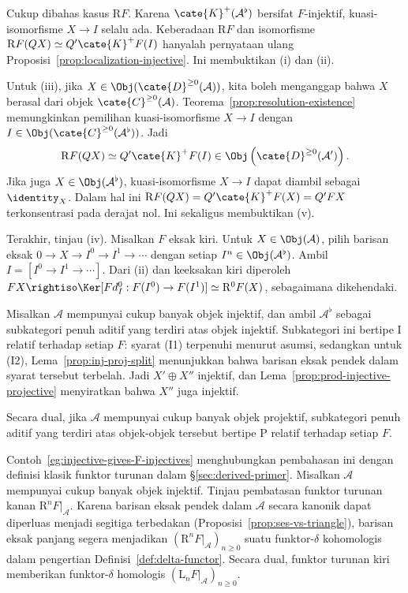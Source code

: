 \begin{bukti}
	Cukup dibahas kasus $\mathrm{R}F$. Karena
	$\cate{K}^+(\mathcal{A}^\flat)$ bersifat $F$-injektif, kuasi-isomorfisme
	$X\to I$ selalu ada. Keberadaan $\mathrm{R}F$ dan isomorfisme
	$\mathrm{R}F(QX)\simeq Q'\cate{K}^+F(I)$ hanyalah pernyataan ulang
	Proposisi~\ref{prop:localization-injective}. Ini membuktikan (i) dan (ii).

	Untuk (iii), jika $X\in\Obj(\cate{D}^{\geq0}(\mathcal{A}))$, kita boleh
	menganggap bahwa $X$ berasal dari objek $\cate{C}^{\geq0}(\mathcal{A})$.
	Teorema~\ref{prop:resolution-existence} memungkinkan pemilihan
	kuasi-isomorfisme $X\to I$ dengan
	$I\in\Obj(\cate{C}^{\geq0}(\mathcal{A}^\flat))$. Jadi
	\[ \mathrm{R}F(QX) \simeq Q' \cate{K}^+ F(I) \in \Obj\left( \cate{D}^{\geq 0}(\mathcal{A}')\right). \]
	Jika juga $X\in\Obj(\mathcal{A}^\flat)$, kuasi-isomorfisme $X\to I$ dapat
	diambil sebagai $\identity_X$. Dalam hal ini
	$\mathrm{R}F(QX)=Q'\cate{K}^+F(X)=Q'FX$ terkonsentrasi pada derajat nol.
	Ini sekaligus membuktikan (v).

	Terakhir, tinjau (iv). Misalkan $F$ eksak kiri. Untuk
	$X\in\Obj(\mathcal{A})$, pilih barisan eksak
	$0\to X\to I^0\to I^1\to\cdots$ dengan setiap
	$I^n\in\Obj(\mathcal{A}^\flat)$. Ambil $I=[I^0\to I^1\to\cdots]$.
	Dari (ii) dan keeksakan kiri diperoleh
	$FX\rightiso\Ker[Fd_I^0:F(I^0)\to F(I^1)]
	\simeq\mathrm{R}^0F(X)$, sebagaimana dikehendaki.
\end{bukti}

\begin{contoh}\label{eg:injective-gives-F-injectives}
	Misalkan $\mathcal{A}$ mempunyai cukup banyak objek injektif, dan ambil
	$\mathcal{A}^\flat$ sebagai subkategori penuh aditif yang terdiri atas objek
	injektif. Subkategori ini bertipe I relatif terhadap setiap $F$: syarat (I1)
	terpenuhi menurut asumsi, sedangkan untuk (I2),
	Lema~\ref{prop:inj-proj-split} menunjukkan bahwa barisan eksak pendek dalam
	syarat tersebut terbelah. Jadi $X'\oplus X''$ injektif, dan
	Lema~\ref{prop:prod-injective-projective} menyiratkan bahwa $X''$ juga
	injektif.

	Secara dual, jika $\mathcal{A}$ mempunyai cukup banyak objek projektif,
	subkategori penuh aditif yang terdiri atas objek-objek tersebut bertipe P
	relatif terhadap setiap $F$.
\end{contoh}

Contoh~\ref{eg:injective-gives-F-injectives} menghubungkan pembahasan ini
dengan definisi klasik funktor turunan dalam \S\ref{sec:derived-primer}.
Misalkan $\mathcal{A}$ mempunyai cukup banyak objek injektif. Tinjau pembatasan
funktor turunan kanan $\mathrm{R}^nF|_{\mathcal{A}}$. Karena barisan eksak
pendek dalam $\mathcal{A}$ secara kanonik dapat diperluas menjadi segitiga
terbedakan (Proposisi~\ref{prop:ses-vs-triangle}), barisan eksak panjang segera
menjadikan $(\mathrm{R}^nF|_{\mathcal{A}})_{n\geq0}$ suatu funktor-$\delta$
kohomologis dalam pengertian Definisi~\ref{def:delta-functor}. Secara dual,
funktor turunan kiri memberikan funktor-$\delta$ homologis
$(\mathrm{L}_nF|_{\mathcal{A}})_{n\geq0}$.

